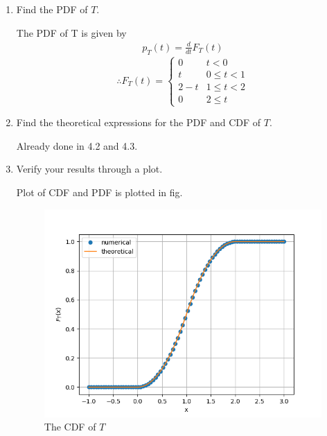 \documentclass[journal,12pt,twocolumn]{IEEEtran}
\renewcommand\thesection{\arabic{section}}
\begin{document}
\begin{enumerate}[label=\thesection.\arabic*
		,ref=\thesection.\theenumi]
		\[
		\therefore
		F_T(t)=
		\begin{cases}
			0&  t<0\\
			\frac{t_2}{2} &  0\leq t<1\\
			\frac{-t^2}{2}+2t-1  &  1\leq t<2\\
			1  & 2\leq t
		\end{cases}
		\]
		\item Find the PDF of $T$.
		
		\solution The PDF of T is given by
		\begin{align}
			p_{T}(t) = \frac{d}{dt}F_{T}(t)
		\end{align}
		\[
		\therefore
		F_T(t)=
		\begin{cases}
			0&  t<0\\
			t &  0\leq t<1\\
			2-t  &  1\leq t<2\\
			0  & 2\leq t
		\end{cases}
		\]
		\item Find the theoretical expressions for the PDF and CDF of $T$.
		
		\solution Already done in 4.2 and 4.3.
		\item Verify your results through a plot. 
		
		\solution Plot of CDF and PDF is plotted in fig. 
		
		\begin{figure}
			\centering
			\includegraphics[width=\columnwidth]{./ques_4/tri_cdf.png}
			\caption{The CDF of $T$}
			\label{tri_cdf}
		\end{figure}
		

\end{enumerate}
\end{document}
